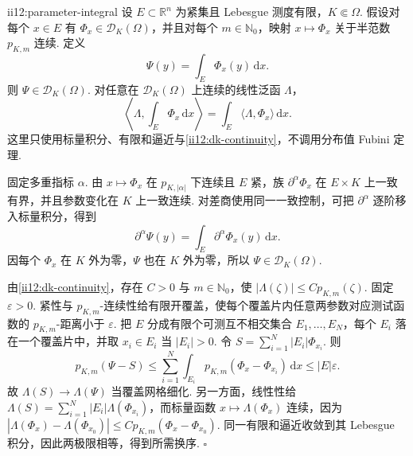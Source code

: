 \begin{FALemma}[B][紧参数测试函数积分与连续泛函换序]{ii12:parameter-integral}
设 \(\displaystyle E\subset\mathbb R^n\) 为紧集且 Lebesgue 测度有限，\(\displaystyle K\Subset\Omega\). 假设对每个 \(\displaystyle x\in E\) 有 \(\displaystyle\Phi_x\in\mathcal D_K(\Omega)\)，并且对每个 \(\displaystyle m\in\mathbb N_0\)，映射 \(\displaystyle x\mapsto\Phi_x\) 关于半范数 \(\displaystyle p_{K,m}\) 连续. 定义
\[
\Psi(y)=\int_E\Phi_x(y)\,\mathrm{d}x.
\]
则 \(\displaystyle\Psi\in\mathcal D_K(\Omega)\). 对任意在 \(\displaystyle\mathcal D_K(\Omega)\) 上连续的线性泛函 \(\displaystyle\Lambda\)，
\[
\left\langle\Lambda,\int_E\Phi_x\,\mathrm{d}x\right\rangle
=
\int_E\langle\Lambda,\Phi_x\rangle\,\mathrm{d}x.
\]
这里只使用标量积分、有限和逼近与\autoref{ii12:dk-continuity}，不调用分布值 Fubini 定理.
\end{FALemma}

\begin{FAProof}
固定多重指标 \(\displaystyle\alpha\). 由 \(\displaystyle x\mapsto\Phi_x\) 在 \(\displaystyle p_{K,|\alpha|}\) 下连续且 \(\displaystyle E\) 紧，族 \(\displaystyle\partial^\alpha\Phi_x\) 在 \(\displaystyle E\times K\) 上一致有界，并且参数变化在 \(\displaystyle K\) 上一致连续. 对差商使用同一一致控制，可把 \(\displaystyle\partial^\alpha\) 逐阶移入标量积分，得到
\[
\partial^\alpha\Psi(y)
=
\int_E\partial^\alpha\Phi_x(y)\,\mathrm{d}x.
\]
因每个 \(\displaystyle\Phi_x\) 在 \(\displaystyle K\) 外为零，\(\displaystyle\Psi\) 也在 \(\displaystyle K\) 外为零，所以 \(\displaystyle\Psi\in\mathcal D_K(\Omega)\).

由\autoref{ii12:dk-continuity}，存在 \(\displaystyle C>0\) 与 \(\displaystyle m\in\mathbb N_0\)，使 \(\displaystyle |\Lambda(\zeta)|\leqslant Cp_{K,m}(\zeta).\)
固定 \(\displaystyle\varepsilon>0\). 紧性与 \(\displaystyle p_{K,m}\)-连续性给有限开覆盖，使每个覆盖片内任意两参数对应测试函数的 \(\displaystyle p_{K,m}\)-距离小于 \(\displaystyle\varepsilon\). 把 \(\displaystyle E\) 分成有限个可测互不相交集合 \(\displaystyle E_1,\dots,E_N\)，每个 \(\displaystyle E_i\) 落在一个覆盖片中，并取 \(\displaystyle x_i\in E_i\) 当 \(\displaystyle|E_i|>0\). 令 \(\displaystyle S=\sum_{i=1}^N|E_i|\Phi_{x_i}\). 则
\[
p_{K,m}(\Psi-S)
\leqslant
\sum_{i=1}^N\int_{E_i}p_{K,m}(\Phi_x-\Phi_{x_i})\,\mathrm{d}x
\leqslant
|E|\varepsilon.
\]
故 \(\displaystyle\Lambda(S)\to\Lambda(\Psi)\) 当覆盖网格细化. 另一方面，线性性给 \(\displaystyle \Lambda(S)=\sum_{i=1}^N|E_i|\Lambda(\Phi_{x_i})\)，而标量函数 \(\displaystyle x\mapsto\Lambda(\Phi_x)\) 连续，因为 \(\displaystyle |\Lambda(\Phi_x)-\Lambda(\Phi_{x_0})| \leqslant Cp_{K,m}(\Phi_x-\Phi_{x_0}).\)
同一有限和逼近收敛到其 Lebesgue 积分，因此两极限相等，得到所需换序.
\hfill\(\square\)
\end{FAProof}

